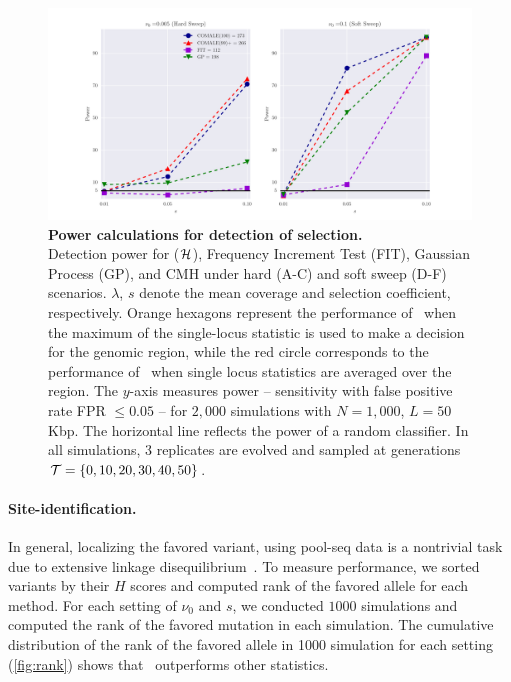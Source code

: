 \begin{figure}
	\centering
	\includegraphics[width=\textwidth]{power.pdf}
	\caption{ {\bf Power calculations for detection of selection.}\\
		Detection power for \comale (${\cal H}$), Frequency Increment
		Test (FIT), Gaussian Process (GP), and CMH under hard (A-C)
		and soft sweep (D-F) scenarios. $\lambda$, $s$ denote the
		mean coverage and selection coefficient, respectively.
		Orange hexagons represent the performance of \comale\ when
		the maximum of the single-locus statistic is used to make a
		decision for the genomic region, while the red circle
		corresponds to the performance of \comale\ when single locus
		statistics are averaged over the region.  The $y$-axis
		measures power -- sensitivity with false positive rate FPR
		$\le 0.05$ -- for $2,000$ simulations with $N=1,000$,
		$L=50$Kbp. The horizontal line reflects the power of a
		random classifier.  In all simulations, 3 replicates are
		evolved and sampled at generations
		${\cal T}=\{0,10,20,30,40,50\}$.}
	\label{fig:power}
\end{figure}
\paragraph{Site-identification.}
In general, localizing the favored variant, using pool-seq data is a
nontrivial task due to extensive linkage
disequilibrium~\cite{tobler2014massive}.  To measure performance, we
sorted variants by their $H$ scores and computed rank of the favored
allele for each method. For each setting of $\nu_0$ and $s$, we
conducted $1000$ simulations and computed the rank of the favored
mutation in each simulation. The cumulative distribution of the rank
of the favored allele in 1000 simulation for each setting
(\ref{fig:rank}) shows that \comale\ outperforms other statistics.

